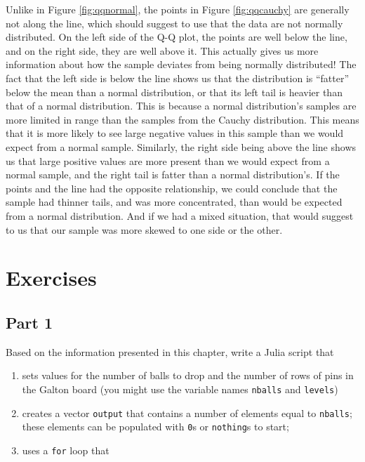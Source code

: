 \documentclass[
  11pt,
]{book}
\providecommand{\tightlist}{%
  \setlength{\itemsep}{0pt}\setlength{\parskip}{0pt}}
\begin{document}
Unlike in Figure \ref{fig:qqnormal}, the points in Figure \ref{fig:qqcauchy} are generally not along the line, which should suggest to use that the data are not normally distributed. On the left side of the Q-Q plot, the points are well below the line, and on the right side, they are well above it. This actually gives us more information about how the sample deviates from being normally distributed! The fact that the left side is below the line shows us that the distribution is \enquote{fatter} below the mean than a normal distribution, or that its left tail is heavier than that of a normal distribution. This is because a normal distribution's samples are more limited in range than the samples from the Cauchy distribution. This means that it is more likely to see large negative values in this sample than we would expect from a normal sample. Similarly, the right side being above the line shows us that large positive values are more present than we would expect from a normal sample, and the right tail is fatter than a normal distribution's. If the points and the line had the opposite relationship, we could conclude that the sample had thinner tails, and was more concentrated, than would be expected from a normal distribution. And if we had a mixed situation, that would suggest to us that our sample was more skewed to one side or the other.

\hypertarget{exercises-1}{%
\section{Exercises}\label{exercises-1}}

\hypertarget{part-1-1}{%
\subsection*{Part 1}\label{part-1-1}}


Based on the information presented in this chapter, write a Julia script that

\begin{enumerate}
\def\labelenumi{\arabic{enumi}.}
\tightlist
\item
  sets values for the number of balls to drop and the number of rows of pins in the Galton board (you might use the variable names \texttt{nballs} and \texttt{levels})
\item
  creates a vector \texttt{output} that contains a number of elements equal to \texttt{nballs}; these elements can be populated with \texttt{0}s or \texttt{nothing}s to start;
\item
  uses a \texttt{for} loop that
\end{enumerate}
\end{document}
